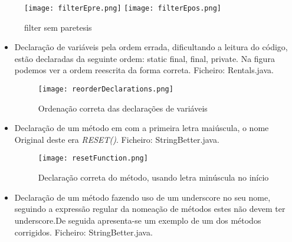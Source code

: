 \begin{itemize}
\begin{itemize}
\begin{figure}[H]
  \centering

  \texttt{[image: filterEpre.png]}
  \texttt{[image: filterEpos.png]}

  \caption {filter sem paretesis}

  \label {fig16}

\end{figure}

\end{itemize}


\begin{itemize}
\item Declaração de variáveis pela ordem errada, dificultando a leitura do código, estão declaradas da seguinte ordem: static final, final, private. Na figura podemos ver a ordem reescrita da forma correta. \newline
 Ficheiro: Rentals.java.\newline


\begin{figure}[H]

  \centering

  \texttt{[image: reorderDeclarations.png]}

  \caption {Ordenação correta das declarações de variáveis}

  \label {fig17}

\end{figure}

\end{itemize}

\begin{itemize}
\item Declaração de um método em com a primeira letra maiúscula, o nome Original deste era \textit{RESET()}. \newline
 Ficheiro: StringBetter.java.\newline


\begin{figure}[H]

  \centering

  \texttt{[image: resetFunction.png]}

  \caption {Declaração correta do método, usando letra minúscula no início}

  \label {fig18}

\end{figure}

\end{itemize}

\begin{itemize}
\item Declaração de um método fazendo uso de um underscore no seu nome, seguindo a expressão regular da nomeação de métodos estes não devem ter underscore.De seguida apresenta-se um exemplo de um dos métodos corrigidos. \newline
 Ficheiro: StringBetter.java.\newline



\end{itemize}
\end{itemize}
